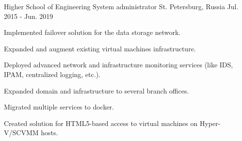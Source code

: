 \begin{cventries}
  \cventry
	{Higher School of Engineering} %
	{System administrator} %
	{St. Petersburg, Russia} %
	{Jul. 2015 - Jun. 2019} %
	{
		\begin{cvitems} %
			\item {Implemented failover solution for the data storage network.}
			\item {Expanded and augment existing virtual machines infrastructure.}
			\item {Deployed advanced network and infrastructure monitoring services (like IDS, IPAM, centralized logging, etc.).}
			\item {Expanded domain and infrastructure to several branch offices.}
			\item {Migrated multiple services to docker.}
			\item {Created solution for HTML5-based access to virtual machines on Hyper-V/SCVMM hosts.}
		\end{cvitems}
	}

\end{cventries}
